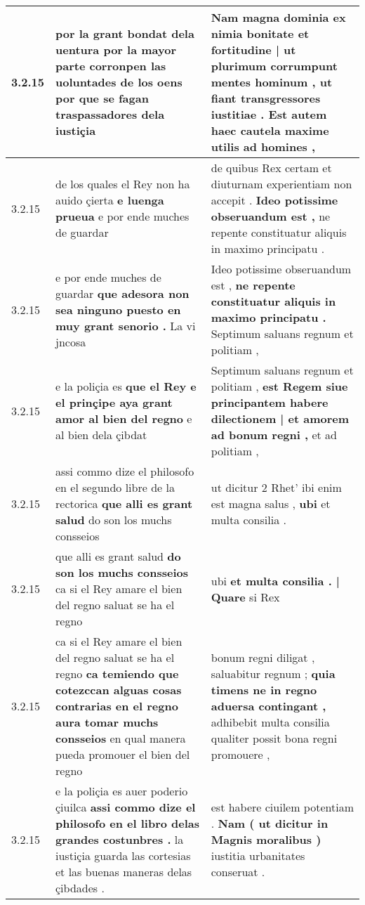 \begin{tabular}{|p{1cm}|p{6.5cm}|p{6.5cm}|}
3.2.15 & por la grant bondat dela uentura \textbf{ por la mayor parte corronpen las uoluntades de los oens } por que se fagan traspassadores dela iustiçia & Nam magna dominia ex nimia bonitate \textbf{ et fortitudine | ut plurimum corrumpunt mentes hominum , } ut fiant transgressores iustitiae . Est autem haec cautela maxime utilis ad homines , \\\hline
3.2.15 & de los quales el Rey non ha auido çierta \textbf{ e luenga prueua } e por ende muches de guardar & de quibus Rex certam et diuturnam experientiam non accepit . \textbf{ Ideo potissime obseruandum est , } ne repente constituatur aliquis in maximo principatu . \\\hline
3.2.15 & e por ende muches de guardar \textbf{ que adesora non sea ninguno puesto en muy grant senorio . } La vi jncosa & Ideo potissime obseruandum est , \textbf{ ne repente constituatur aliquis in maximo principatu . } Septimum saluans regnum et politiam , \\\hline
3.2.15 & e la poliçia es \textbf{ que el Rey e el prinçipe aya grant amor al bien del regno } e al bien dela çibdat & Septimum saluans regnum et politiam , \textbf{ est Regem siue principantem habere dilectionem | et amorem ad bonum regni , } et ad politiam , \\\hline
3.2.15 & assi commo dize el philosofo en el segundo libre de la rectorica \textbf{ que alli es grant salud } do son los muchs consseios & ut dicitur 2 Rhet’ ibi enim est magna salus , \textbf{ ubi } et multa consilia . \\\hline
3.2.15 & que alli es grant salud \textbf{ do son los muchs consseios } ca si el Rey amare el bien del regno saluat se ha el regno & ubi \textbf{ et multa consilia . | Quare } si Rex \\\hline
3.2.15 & ca si el Rey amare el bien del regno saluat se ha el regno \textbf{ ca temiendo que cotezccan alguas cosas contrarias en el regno aura tomar muchs consseios } en qual manera pueda promouer el bien del regno & bonum regni diligat , saluabitur regnum ; \textbf{ quia timens ne in regno aduersa contingant , } adhibebit multa consilia qualiter possit bona regni promouere , \\\hline
3.2.15 & e la poliçia es auer poderio çiuilca \textbf{ assi commo dize el philosofo en el libro delas grandes costunbres . } la iustiçia guarda las cortesias et las buenas maneras delas çibdades . & est habere ciuilem potentiam . \textbf{ Nam ( ut dicitur in Magnis moralibus ) } iustitia urbanitates conseruat . \\\hline

\end{tabular}
